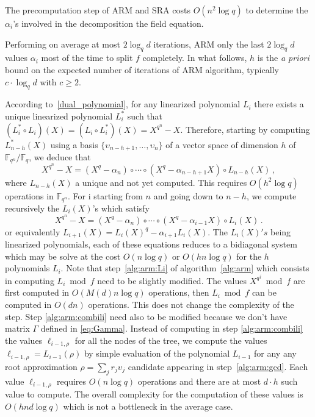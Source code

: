 \documentclass{sig-alternate}
\newcommand{\ff}[1]{\mathbb{F}_{#1}}
\newcommand{\dd}{d}
\newcommand{\qq}{q}
\newcommand{\nn}{n}
\newcommand{\qn}{{\qq^\nn}}
\newcommand{\basef}{\ff{\qq}}
\newcommand{\extf}{\ff{\qn}}
\newcommand{\bigO}{O}
\newcounter{algo}
\begin{document}
\medskip







 The precomputation step of ARM and SRA costs $O(\nn^2 \log \qq)$ to determine the $\alpha_i$'s involved in the decomposition the field equation.

Performing on average at most $2\log_\qq d$ iterations, ARM only the last $2\log_\qq d$ values $\alpha_i$ most of the time to split $f$ completely.
In what follows, $h$ is the \emph{a priori} bound on the expected number of iterations of ARM algorithm, typically $c \cdot \log_\qq d$ with $c \ge 2$. 


According to~\eqref{dual_polynomial}, for any linearized polynomial $L_i$ there exists a unique linearized polynomial $L_i^\ast$ such that $(L_i^\ast\circ L_i)(X)=(L_i\circ L_i^\ast)(X)=X^{\qq^\nn}-X$. 
Therefore, starting  by computing $L_{n-h}^\ast(X)$ using a basis $\{\upsilon_{n-h+1},\ldots,\upsilon_n\}$ of a vector space of dimension $h$ of $\extf/\basef$, we deduce that
$$X^{\qq^\nn}-X=(X^{\qq}-\alpha_n) \circ \cdots \circ (X^{\qq}-\alpha_{n-h+1} X) \circ L_{n-h}(X)\,,$$
where $L_{n-h}(X)$ a unique and not yet computed. This requires $O(h^2\log\qq)$ operations in $\extf$. For i starting from $\nn$ and going down to $n-h$,
 we compute recursively the $L_i(X)$'s which satisfy
$$X^{\qq^\nn}-X= (X^{\qq}-\alpha_n) \circ \cdots \circ (X^{\qq}-\alpha_{i-1} X) \circ L_{i}(X)\,.  $$
or equivalently $L_{i+1}(X)=L_i(X)^q-\alpha_{i+1}L_i(X)$. The $L_i(X)'s$ being linearized polynomials, each of these equations reduces to
a bidiagonal system which may be solve at the cost $O(\nn \log q)$ or $O(h \nn \log q)$ for the $h$ polynomials $L_i$.
Note that step~\ref{alg:arm:Li} of algorithm~\ref{alg:arm} which consists in computing $L_i \bmod f$ need to be slightly modified. The values $X^{q^j}\bmod f$ are first computed in $O(M(d)n\log q)$ operations, then $L_i\bmod f$ can be computed in $O(\dd \nn)$ operations. This does not change the complexity of the step. Step \ref{alg:arm:combili} need also to be modified because we don't have matrix $\Gamma$ defined in \eqref{eq:Gamma}. Instead of computing in step \ref{alg:arm:combili}
 the values $\ell_{i-1, \rho}$ for all the nodes of the tree, we compute the values $\ell_{i-1, \rho}= L_{i-1}(\rho)$ by simple evaluation of the polynomial $L_{i-1}$ for any any root approximation $\rho=\sum_j r_j \upsilon_j$ candidate appearing in step~\ref{alg:arm:gcd}. Each value $\ell_{i-1, \rho}$ requires $\bigO(\nn \log \qq)$ operations and there are at most $d \cdot h$ such value to compute. The overall complexity for the computation of these values is $O(h \nn\dd  \log \qq )$ which is not a bottleneck in the average case. 
\end{document}
